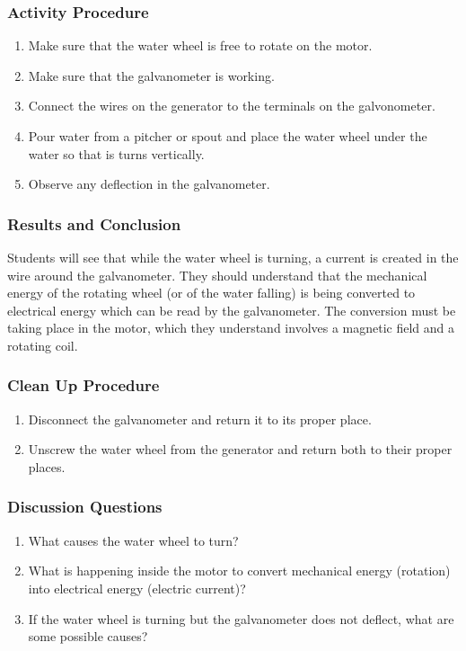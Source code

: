 \subsubsection*{Activity Procedure}
\begin{enumerate}
\item{Make sure that the water wheel is free to rotate on the motor.} 
\item{Make sure that the galvanometer is working.} 
\item{Connect the wires on the generator to the terminals on the galvonometer.} 
\item{Pour water from a pitcher or spout and place the water wheel under the water so that is turns vertically.} 
\item{Observe any deflection in the galvanometer.} 
\end{enumerate}

\subsubsection*{Results and Conclusion}
Students will see that while the water wheel is turning, a current is created in the wire around the galvanometer. They should understand that the mechanical energy of the rotating wheel (or of the water falling) is being converted to electrical energy which can be read by the galvanometer. The conversion must be taking place in the motor, which they understand involves a magnetic field and a rotating coil.  

\subsubsection*{Clean Up Procedure}
\begin{enumerate}
\item{Disconnect the galvanometer and return it to its proper place.} 
\item{Unscrew the water wheel from the generator and return both to their proper places.} 
\end{enumerate}

\subsubsection*{Discussion Questions}
\begin{enumerate}
\item{What causes the water wheel to turn?}
\item{What is happening inside the motor to convert mechanical energy (rotation) into electrical energy (electric current)?}
\item{If the water wheel is turning but the galvanometer does not deflect, what are some possible causes?}
\end{enumerate}


